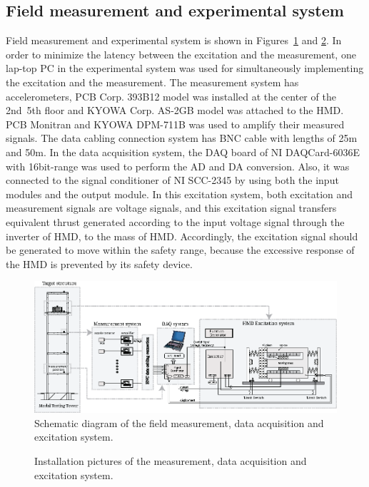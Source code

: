 \subsection{Field measurement and experimental system}
Field measurement and experimental system is shown in Figures~\ref{fig:7-3} and \ref{fig:7-4}. In order to minimize the latency between the excitation and the measurement, one lap-top PC in the experimental system was used for simultaneously implementing the excitation and the measurement. The measurement system has accelerometers, PCB Corp. 393B12 model was installed at the center of the 2nd~5th floor and KYOWA Corp. AS-2GB model was attached to the HMD. PCB Monitran and KYOWA DPM-711B was used to amplify their measured signals. The data cabling connection system has BNC cable with lengths of 25m and 50m. In the data acquisition system, the DAQ board of NI DAQCard-6036E with 16bit-range was used to perform the AD and DA conversion. Also, it was connected to the signal conditioner of NI SCC-2345 by using both the input modules and the output module. 
In this excitation system, both excitation and measurement signals are voltage signals, and this excitation signal transfers equivalent thrust generated according to the input voltage signal through the inverter of HMD, to the mass of HMD. Accordingly, the excitation signal should be generated to move within the safety range, because the excessive response of the HMD is prevented by its safety device.

\begin{figure}[ht]
\centering
\includegraphics[width=1\textwidth] {figure/7-3.eps}
\caption{Schematic diagram of the field measurement, data acquisition and excitation system.}
\label{fig:7-3}
\end{figure}

\begin{figure}[!ht]
\centering
{}
\caption{Installation pictures of the measurement, data acquisition and excitation system.}
\label{fig:7-4}
\end{figure}

